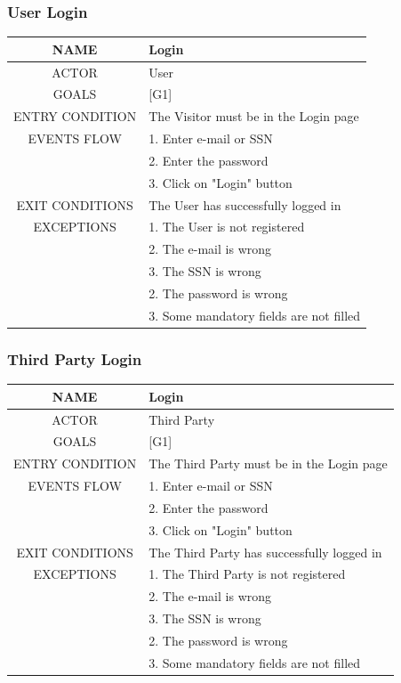 \documentclass[12pt,a4paper]{article}
\begin{document}
	\subsubsection{User Login }
	\begin{center}
		\begin{tabular}{| c | l |}
			\hline
			NAME & Login \\
			\hline
			ACTOR & User \\
			\hline
			GOALS & [G1] \\
			\hline
			ENTRY CONDITION & The Visitor must be in the Login page \\ \hline
			EVENTS FLOW  &
			1. Enter e-mail or SSN\\
			&2. Enter the password\\
			&3. Click on "Login" button\\
			\hline
			EXIT CONDITIONS  & The User has successfully logged in \\ \hline
			EXCEPTIONS & 
			1. The User is not registered\\
			&2. The e-mail is wrong\\
			&3. The SSN is wrong\\
			&2. The password is wrong\\
			&3. Some mandatory fields are not filled\\
			\hline
		\end{tabular}
	\end{center}

	\subsubsection{Third Party Login}
	\begin{center}
		\begin{tabular}{| c | l |}
			\hline
			NAME & Login \\
			\hline
			ACTOR & Third Party \\
			\hline
			GOALS & [G1] \\
			\hline
			ENTRY CONDITION & The Third Party must be in the Login page \\ \hline
			EVENTS FLOW  &
			1. Enter e-mail or SSN\\
			&2. Enter the password\\
			&3. Click on "Login" button\\
			\hline
			EXIT CONDITIONS  & The Third Party has successfully logged in \\ \hline
			EXCEPTIONS & 
			1. The Third Party is not registered\\
			&2. The e-mail is wrong\\
			&3. The SSN is wrong\\
			&2. The password is wrong\\
			&3. Some mandatory fields are not filled\\
			\hline
		\end{tabular}
	\end{center}
\end{document}
